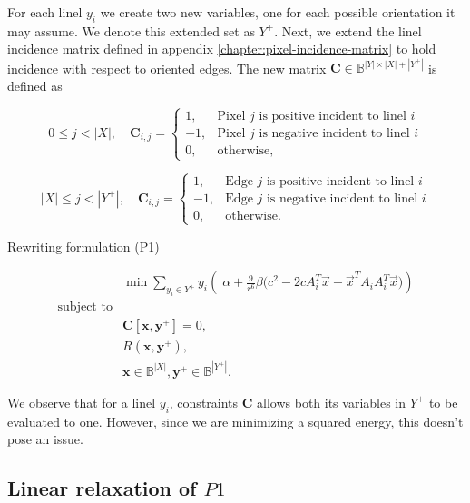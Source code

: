 For each linel $y_i$ we create two new variables, one for each possible orientation it may assume. We denote this extended set as $Y^+$. Next, we extend the linel incidence matrix defined in appendix \ref{chapter:pixel-incidence-matrix} to hold incidence with respect to oriented edges. The new matrix $\mathbf{C} \in \mathbb{B}^{|Y| \times |X| + |Y^+|}$ is defined as

\[
	0 \leq j < |X|, \quad \mathbf{C}_{i,j} = \left\{ \begin{array}{ll}
	
	1,& \text{Pixel $j$ is positive incident to linel $i$}\\
	-1,& \text{Pixel $j$ is negative incident to linel $i$}\\	
	0,& \text{otherwise},
	\end{array}\right.
\]

\[
	|X| \leq j < |Y^+|, \quad \mathbf{C}_{i,j} = \left\{ \begin{array}{ll}
	
	1,& \text{Edge $j$ is positive incident to linel $i$}\\
	-1,& \text{Edge $j$ is negative incident to linel $i$}\\	
	0,& \text{otherwise}.
	\end{array}\right.
\]

Rewriting formulation (P1)

\[
\begin{array}{ll}
& \displaystyle	\min \sum_{y_i \in Y^+}{ y_i \left(\; \alpha + \frac{9}{r^6}\beta \big(c^2 - 2cA_i^T\vec{x} + \vec{x}^TA_iA_i^T\vec{x}\big)\right)} \\
\text{subject to}\\
&	\mathbf{C}[ \mathbf{x}, \mathbf{y}^+] = 0,\\
&   R(\mathbf{x},\mathbf{y}^+),\\
&   \mathbf{x} \in \mathbb{B}^{|X|}, \mathbf{y^+} \in \mathbb{B}^{|Y^+|}.
\end{array}
\]


We observe that for a linel $y_i$, constraints $\mathbf{C}$ allows both its variables in $Y^+$ to be evaluated to one. However, since we are minimizing a squared energy, this doesn't pose an issue.




\subsection{Linear relaxation of $P1$}

